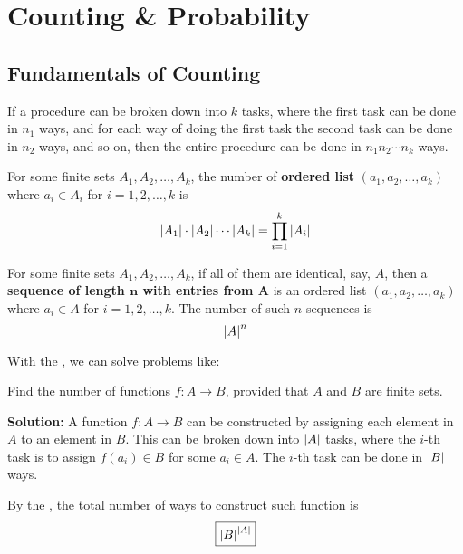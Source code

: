 \section{Counting \& Probability}

\subsection{Fundamentals of Counting}

\begin{theorem} \label{thm:product-rule}
    If a procedure can be broken down into $k$ tasks, where the first task can be done in $n_1$
    ways, and for each way of doing the first task the second task can be done in $n_2$ ways,
    and so on, then the entire procedure can be done in $n_1 n_2 \cdots n_k$ ways.
\end{theorem}

\begin{theorem}
    For some finite sets $A_1, A_2, \ldots, A_k$, the number of \textbf{ordered list}
    $(a_1, a_2, \ldots, a_k)$ where $a_i \in A_i$ for $i=1,2,\ldots,k$ is
    \[
        \left|A_1\right| \cdot \left|A_2\right| \cdots \left|A_k\right| = \prod_{i=1}^k \left|A_i\right|
    \]
\end{theorem}

\begin{corollary}
    For some finite sets $A_1, A_2, \ldots, A_k$, if all of them are identical, say, $A$,
    then a \textbf{sequence of length $\bm{n}$ with entries from $\bm{A}$} is an ordered list
    $(a_1, a_2, \ldots, a_k)$ where $a_i \in A$ for $i=1,2,\ldots,k$. The number of such
    $n$-sequences is
    \[
        \left|A\right|^n
    \]
\end{corollary}

With the , we can solve problems like:

\begin{example}
    Find the number of functions $f:A\to B$, provided that $A$ and $B$ are finite sets.

    \textbf{Solution:}
    A function $f:A\to B$ can be constructed by assigning each element in $A$ to an element in $B$.
    This can be broken down into $\left|A\right|$ tasks, where the $i$-th task is to assign $f(a_i)\in B$
    for some $a_i \in A$. The $i$-th task can be done in $\left|B\right|$ ways.

    By the , the total number of ways to construct such function is
    \[
        \boxed{\left|B\right|^{\left|A\right|}}
    \]
\end{example}


